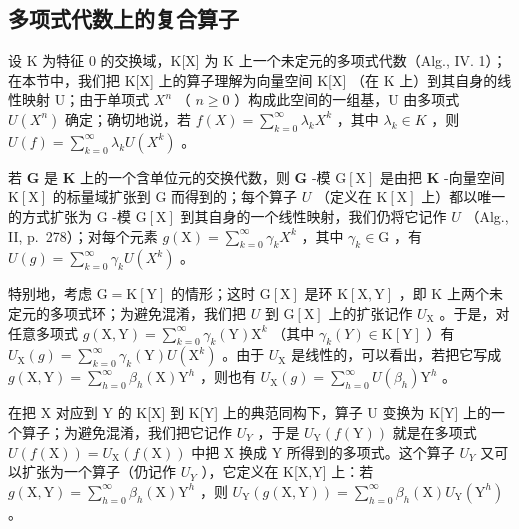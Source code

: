 \subsection{多项式代数上的复合算子}

设 K 为特征 0 的交换域，K{[}X{]} 为 K 上一个未定元的多项式代数（Alg., IV. 1）；在本节中，我们把 K{[}X{]} 上的算子理解为向量空间 K{[}X{]} （在 K 上）到其自身的线性映射 U；由于单项式 \(X^{n}\) （ \(n \geqslant 0\) ）构成此空间的一组基，U 由多项式 \(U(X^{n})\) 确定；确切地说，若 \(f(X) = \sum_{k=0}^{\infty} \lambda_{k} X^{k}\) ，其中 \(\lambda_{k} \in K\) ，则 \(U(f) = \sum_{k=0}^{\infty} \lambda_{k} U(X^{k})\) 。

若 \(\mathbf{G}\) 是 \(\mathbf{K}\) 上的一个含单位元的交换代数，则 \(\mathbf{G}\) -模 \(\mathrm{G}[\mathrm{X}]\) 是由把 \(\mathbf{K}\) -向量空间 \(\mathrm{K}[\mathrm{X}]\) 的标量域扩张到 \(\mathrm{G}\) 而得到的；每个算子 \(U\) （定义在 \(\mathrm{K}[\mathrm{X}]\) 上）都以唯一的方式扩张为 \(\mathrm{G}\) -模 \(\mathrm{G}[\mathrm{X}]\) 到其自身的一个线性映射，我们仍将它记作 \(U\) （Alg., II, p.~278）；对每个元素 \(g(\mathrm{X}) = \sum_{k=0}^{\infty} \gamma_k X^k\) ，其中 \(\gamma_k \in \mathrm{G}\) ，有 \(U(g) = \sum_{k=0}^{\infty} \gamma_k U(X^k)\) 。

特别地，考虑 \(\mathrm{G} = \mathrm{K}[\mathrm{Y}]\) 的情形；这时 \(\mathrm{G}[\mathrm{X}]\) 是环 \(\mathrm{K}[\mathrm{X},\mathrm{Y}]\) ，即 \(\mathrm{K}\) 上两个未定元的多项式环；为避免混淆，我们把 \(U\) 到 \(\mathrm{G}[\mathrm{X}]\) 上的扩张记作 \(U_{\mathrm{X}}\) 。于是，对任意多项式 \(g(\mathrm{X},\mathrm{Y}) = \sum_{k=0}^{\infty}\gamma_k(\mathrm{Y})\mathrm{X}^k\) （其中 \(\gamma_k(Y)\in \mathrm{K}[\mathrm{Y}]\) ）有 \(U_{\mathrm{X}}(g) = \sum_{k=0}^{\infty}\gamma_k(\mathrm{Y})U(\mathrm{X}^k)\) 。由于 \(U_{\mathrm{X}}\) 是线性的，可以看出，若把它写成 \(g(\mathrm{X},\mathrm{Y}) = \sum_{h=0}^{\infty}\beta_h(\mathrm{X})\mathrm{Y}^h\) ，则也有 \(U_{\mathrm{X}}(g) = \sum_{h=0}^{\infty}U(\beta_h)\mathrm{Y}^h\) 。

在把 X 对应到 Y 的 K{[}X{]} 到 K{[}Y{]} 上的典范同构下，算子 U 变换为 K{[}Y{]} 上的一个算子；为避免混淆，我们把它记作 \(U_{Y}\) ，于是 \(U_{\mathrm{Y}}(f(\mathrm{Y}))\) 就是在多项式 \(U(f(\mathrm{X})) = U_{\mathrm{X}}(f(\mathrm{X}))\) 中把 X 换成 Y 所得到的多项式。这个算子 \(U_{Y}\) 又可以扩张为一个算子（仍记作 \(U_{Y}\) ），它定义在 K{[}X,Y{]} 上：若 \(g(\mathrm{X}, \mathrm{Y}) = \sum_{h=0}^{\infty} \beta_{h}(\mathrm{X}) \mathrm{Y}^{h}\) ，则 \(U_{\mathrm{Y}}(g(\mathrm{X}, \mathrm{Y})) = \sum_{h=0}^{\infty} \beta_{h}(\mathrm{X}) U_{\mathrm{Y}}(\mathrm{Y}^{h})\) 。

